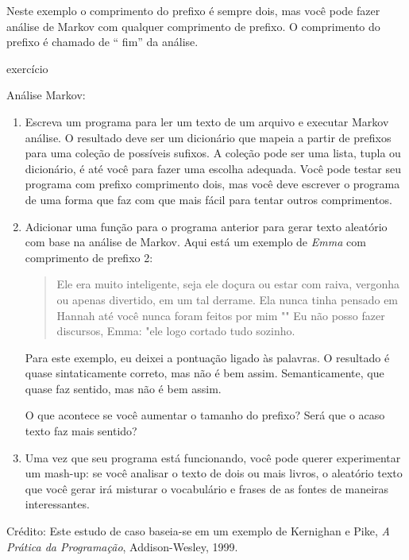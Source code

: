 \documentclass[10pt]{book}
\begin{document}
\begin{v erbatim}
Neste exemplo o comprimento do prefixo é sempre dois, mas
você pode fazer análise de Markov com qualquer comprimento de prefixo. O comprimento
do prefixo é chamado de `` fim'' da análise.

\begin{} exercício

Análise Markov:

\begin{enumerate}

\item Escreva um programa para ler um texto de um arquivo e executar Markov
análise. O resultado deve ser um dicionário que mapeia a partir de
prefixos para uma coleção de possíveis sufixos. A coleção
pode ser uma lista, tupla ou dicionário, é até você para fazer
uma escolha adequada. Você pode testar seu programa com prefixo
comprimento dois, mas você deve escrever o programa de uma forma que faz com que
mais fácil para tentar outros comprimentos.

\item Adicionar uma função para o programa anterior para gerar texto aleatório
com base na análise de Markov. Aqui está um exemplo de {\em Emma}
com comprimento de prefixo 2:

\begin{quote}
Ele era muito inteligente, seja ele doçura ou estar com raiva, vergonha ou apenas
divertido, em um tal derrame. Ela nunca tinha pensado em Hannah até você
nunca foram feitos por mim "" Eu não posso fazer discursos, Emma: "ele logo cortado
tudo sozinho.
\end{quote}

Para este exemplo, eu deixei a pontuação ligado às palavras.
O resultado é quase sintaticamente correto, mas não é bem assim.
Semanticamente, que quase faz sentido, mas não é bem assim.

O que acontece se você aumentar o tamanho do prefixo? Será que o acaso
texto faz mais sentido?

\item Uma vez que seu programa está funcionando, você pode querer experimentar um mash-up:
se você analisar o texto de dois ou mais livros, o aleatório
texto que você gerar irá misturar o vocabulário e frases de
as fontes de maneiras interessantes.

\end{enumerate}

Crédito: Este estudo de caso baseia-se em um exemplo de Kernighan e
Pike, {\em A Prática da Programação}, Addison-Wesley, 1999.


\end{}
\end{v erbatim}
\end{document}
